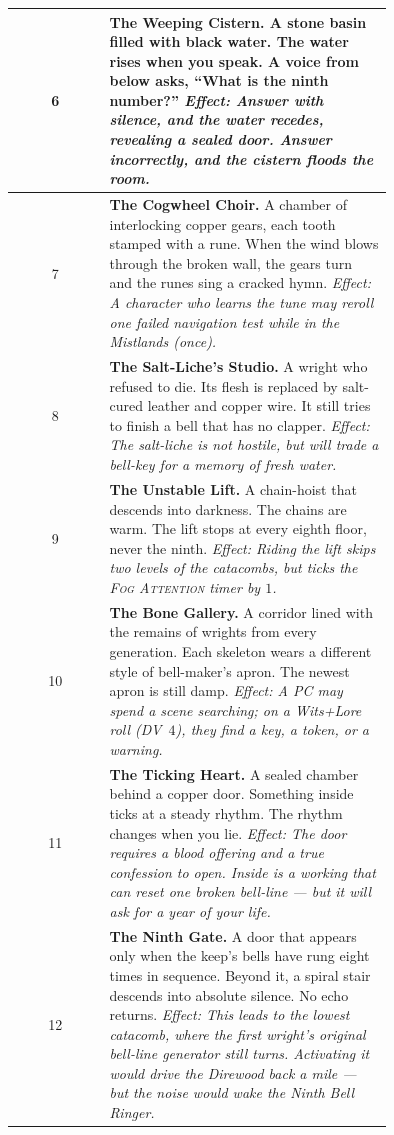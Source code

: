 \begin{tcolorbox}[
  enhanced,
  breakable,
  colback=black!3,
  colframe=blue!60!black,
  title={Generator --- Black Barrow Keep: Rooms \& Encounters},
  left=2mm,right=2mm,top=2mm,bottom=2mm
]
\begin{longtable}{|c|p{0.75\linewidth}|}
6 & \textbf{The Weeping Cistern.}
    A stone basin filled with black water. The water rises when you
    speak. A voice from below asks, ``What is the ninth number?''
    \textit{Effect: Answer with silence, and the water recedes,
    revealing a sealed door. Answer incorrectly, and the cistern floods
    the room.} \\ \hline

7 & \textbf{The Cogwheel Choir.}
    A chamber of interlocking copper gears, each tooth stamped with a
    rune. When the wind blows through the broken wall, the gears turn
    and the runes sing a cracked hymn.
    \textit{Effect: A character who learns the tune may reroll one
    failed navigation test while in the Mistlands (once).} \\ \hline

8 & \textbf{The Salt-Liche's Studio.}
    A wright who refused to die. Its flesh is replaced by
    salt-cured leather and copper wire. It still tries to finish a bell
    that has no clapper.
    \textit{Effect: The salt-liche is not hostile, but will trade a
    bell-key for a memory of fresh water.} \\ \hline

9 & \textbf{The Unstable Lift.}
    A chain-hoist that descends into darkness. The chains are warm.
    The lift stops at every eighth floor, never the ninth.
    \textit{Effect: Riding the lift skips two levels of the catacombs,
    but ticks the \textsc{Fog Attention} timer by $1$.} \\ \hline

10 & \textbf{The Bone Gallery.}
    A corridor lined with the remains of wrights from every generation.
    Each skeleton wears a different style of bell-maker's apron. The
    newest apron is still damp.
    \textit{Effect: A PC may spend a scene searching; on a
    Wits+Lore roll (DV~$4$), they find a key, a token, or a warning.} \\ \hline

11 & \textbf{The Ticking Heart.}
    A sealed chamber behind a copper door. Something inside ticks at a
    steady rhythm. The rhythm changes when you lie.
    \textit{Effect: The door requires a blood offering and a true
    confession to open. Inside is a working that can reset one broken
    bell-line --- but it will ask for a year of your life.} \\ \hline

12 & \textbf{The Ninth Gate.}
    A door that appears only when the keep's bells have rung eight
    times in sequence. Beyond it, a spiral stair descends into absolute
    silence. No echo returns.
    \textit{Effect: This leads to the lowest catacomb, where the first
    wright's original bell-line generator still turns. Activating it
    would drive the Direwood back a mile --- but the noise would wake the
    Ninth Bell Ringer.} \\ \hline
\end{longtable}


\end{tcolorbox}
